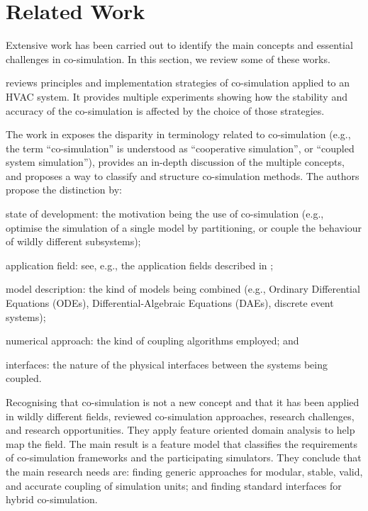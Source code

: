 
\section{Related Work}\label{sec:related}

Extensive work has been carried out to identify the main concepts and essential challenges in co-simulation.
In this section, we review some of these works.

\cite{Trcka2007} reviews principles and implementation strategies of co-simulation applied to an HVAC system.
It provides multiple experiments showing how the stability and accuracy of the co-simulation is affected by the choice of those strategies.

The work in \cite{Hafner2017} exposes the disparity in terminology related to co-simulation (e.g., the term ``co-simulation'' is understood as ``cooperative simulation'', or ``coupled system simulation''), provides an in-depth discussion of the multiple concepts, and proposes a way to classify and structure co-simulation methods.
The authors propose the distinction by:
\begin{compactdesc}
\item[state of development:] the motivation being the use of co-simulation (e.g., optimise the simulation of a single model by partitioning, or couple the behaviour of wildly different subsystems);
\item[application field:] see, e.g., the application fields described in \cite{Gomes&17};
\item[model description:]  the kind of models being combined (e.g., Ordinary Differential Equations (ODEs), Differential-Algebraic Equations (DAEs), discrete event systems);
\item[numerical approach:] the kind of coupling algorithms employed; and
\item[interfaces:]  the nature of the physical interfaces between the systems being coupled.
\end{compactdesc}

Recognising that co-simulation is not a new concept and that it has been applied in wildly different fields, \cite{Gomes&18} reviewed co-simulation approaches, research challenges, and research opportunities.
They apply feature oriented domain analysis \cite{Kang1990} to help map the field.
The main result is a feature model that classifies the requirements of co-simulation frameworks and the participating simulators.
They conclude that the main research needs are: finding generic approaches for modular, stable, valid, and accurate coupling of simulation units; and finding standard interfaces for hybrid co-simulation.

